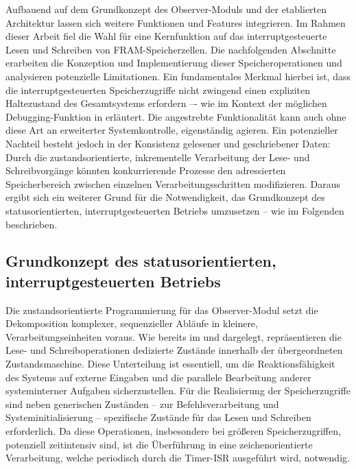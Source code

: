Aufbauend auf dem Grundkonzept des Observer-Moduls und der etablierten Architektur lassen sich weitere Funktionen und Features integrieren. Im Rahmen dieser Arbeit fiel die Wahl f\"ur eine Kernfunktion auf das interruptgesteuerte Lesen und Schreiben von FRAM-Speicherzellen. Die nachfolgenden Abschnitte erarbeiten die Konzeption und Implementierung dieser Speicheroperationen und analysieren potenzielle Limitationen. Ein fundamentales Merkmal hierbei ist, dass die interruptgesteuerten Speicherzugriffe nicht zwingend einen expliziten Haltezustand des Gesamtsystems erfordern –- wie im Kontext der m\"oglichen Debugging-Funktion in  erl\"autert. Die angestrebte Funktionalit\"at kann auch ohne diese Art an erweiterter Systemkontrolle, eigenst\"andig agieren. Ein potenzieller Nachteil besteht jedoch in der Konsistenz gelesener und geschriebener Daten: Durch die zustandsorientierte, inkrementelle Verarbeitung der Lese- und Schreibvorg\"ange k\"onnten konkurrierende Prozesse den adressierten Speicherbereich zwischen einzelnen Verarbeitungsschritten modifizieren. Daraus ergibt sich ein weiterer Grund f\"ur die Notwendigkeit, das Grundkonzept des statusorientierten, interruptgesteuerten Betriebs umzusetzen – wie im Folgenden beschrieben.


\subsection{Grundkonzept des statusorientierten, interruptgesteuerten Betriebs}
\label{sec:konzept_status_&_interrupt}

Die zustandsorientierte Programmierung f\"ur das Observer-Modul setzt die Dekomposition komplexer, sequenzieller Abl\"aufe in kleinere, Verarbeitungseinheiten voraus. Wie bereits im  und  dargelegt, repr\"asentieren die Lese- und Schreiboperationen dedizierte Zust\"ande innerhalb der \"ubergeordneten Zustandsmaschine. Diese Unterteilung ist essentiell, um die Reaktionsf\"ahigkeit des Systems auf externe Eingaben und die \glqq{}parallele\grqq{} Bearbeitung anderer systeminterner Aufgaben sicherzustellen. F\"ur die Realisierung der Speicherzugriffe sind neben generischen Zust\"anden -- zur Befehlsverarbeitung und Systeminitialisierung -- spezifische Zust\"ande f\"ur das Lesen und Schreiben erforderlich. Da diese Operationen, insbesondere bei gr\"o{\ss}eren Speicherzugriffen, potenziell zeitintensiv sind, ist die \"Uberf\"uhrung in eine zeichenorientierte Verarbeitung, welche periodisch durch die Timer-ISR ausgef\"uhrt wird, notwendig.


